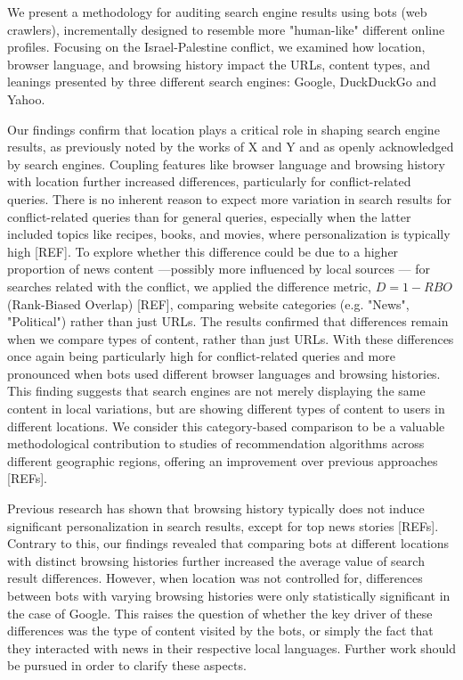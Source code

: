 We present a methodology for auditing search engine results using bots (web crawlers), incrementally designed to resemble more "human-like" different online profiles. Focusing on the Israel-Palestine conflict, we examined how location, browser language, and browsing history impact the URLs, content types, and leanings presented by three different search engines: Google, DuckDuckGo and Yahoo.

Our findings confirm that location plays a critical role in shaping search engine results, as previously noted by the works of X and Y and as openly acknowledged by search engines. Coupling features like browser language and browsing history with location further increased differences, particularly for conflict-related queries. There is no inherent reason to expect more variation in search results for conflict-related queries than for general queries, especially when the latter included topics like recipes, books, and movies, where personalization is typically high [REF]. To explore whether this difference could be due to a higher proportion of news content —possibly more influenced by local sources — for searches related with the conflict, we applied the difference metric, $D = 1 - RBO$ (Rank-Biased Overlap) [REF], comparing website categories (e.g. "News", "Political") rather than just URLs. The results confirmed that differences remain when we compare types of content, rather than just URLs. With these differences once again being particularly high for conflict-related queries and more pronounced when bots used different browser languages and browsing histories. This finding suggests that search engines are not merely displaying the same content in local variations, but are showing different types of content to users in different locations. We consider this category-based comparison to be a valuable methodological contribution to studies of recommendation algorithms across different geographic regions, offering an improvement over previous approaches [REFs].

Previous research has shown that browsing history typically does not induce significant personalization in search results, except for top news stories [REFs]. Contrary to this, our findings revealed that comparing bots at different locations with distinct browsing histories further increased the average value of search result differences. However, when location was not controlled for, differences between bots with varying browsing histories were only statistically significant in the case of Google. This raises the question of whether the key driver of these differences was the type of content visited by the bots, or simply the fact that they interacted with news in their respective local languages. Further work should be pursued in order to clarify these aspects. 

